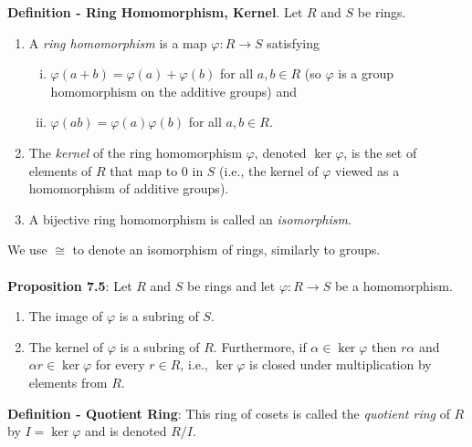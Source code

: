 \documentclass{article}
\begin{document}
\textbf{Definition - Ring Homomorphism, Kernel}. Let $R$ and $S$ be rings. \begin{enumerate}
    \item A \textit{ring homomorphism} is a map $\varphi: R \rightarrow S$ satisfying
    \begin{enumerate}[(i).]
        \item $\varphi(a + b) = \varphi(a) + \varphi(b)$ for all $a, b \in R$ (so $\varphi$ is a group homomorphism on the additive groups) and
        \item $\varphi(ab) = \varphi(a) \varphi(b)$ for all $a, b \in R$.
    \end{enumerate}
    \item The \textit{kernel} of the ring homomorphism $\varphi$, denoted $\ker \varphi$, is the set of elements of $R$ that map to 0 in $S$ (i.e., the kernel of $\varphi$ viewed as a homomorphism of additive groups).
    \item A bijective ring homomorphism is called an \textit{isomorphism}. 
\end{enumerate} $ $ \\
We use $\cong$ to denote an isomorphism of rings, similarly to groups. \\ \\
\textbf{Proposition 7.5}: Let $R$ and $S$ be rings and let $\varphi: R \rightarrow S$ be a homomorphism. \begin{enumerate}
    \item The image of $\varphi$ is a subring of $S$.
    \item The kernel of $\varphi$ is a subring of $R$. Furthermore, if $\alpha \in \ker \varphi$ then $r \alpha$ and $\alpha r \in \ker \varphi$ for every $r \in R$, i.e., $\ker \varphi$ is closed under multiplication by elements from $R$.
\end{enumerate} $ $ \\
\textbf{Definition - Quotient Ring}: This ring of cosets is called the \textit{quotient ring} of $R$ by $I = \ker \varphi$ and is denoted $R / I$. \\ \\
\end{document}

